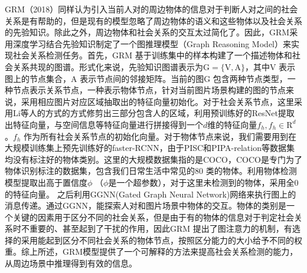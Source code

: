 GRM（2018）\cite{wang2018deep}同样认为引入当前人对的周边物体的信息对于判断人对之间的社会关系是有帮助的，但是现有的模型忽略了周边物体的语义和这些物体以及社会关系的先验知识。除此之外，周边物体和社会关系的交互太过简化了。因此，GRM采用深度学习结合先验知识制定了一个图推理模型（Graph Reasoning Model）来实现社会关系检测任务。首先，GRM 基于训练集中的样本构建了一个描述物体和社会关系共现的图谱。形式化来说，先验知识图谱表示为$\mathrm{G} = \{\mathrm{V},\mathrm{A}\}$，其中$\mathrm{V}$ 表示图上的节点集合，$\mathrm{A}$ 表示节点间的邻接矩阵。当前的图$\mathrm{G}$ 包含两种节点类型，一种节点表示关系节点，一种表示物体节点，针对当前图片场景构建的图的节点来说，采用相应图片对应区域抽取出的特征向量初始化。对于社会关系节点，这里采用Li等人的方式\cite{li2017dual-glance}的方式修剪出三部分包含人的区域，利用预训练好的ResNet提取出特征向量，与空间信息等特征向量进行拼接得到一个$d$维的特征向量$f_{h},f_{h} \in \mathrm{R}^d$。$f_h$ 作为所有社会关系节点的初始化向量。对于物体节点来说，我们需要用到在大规模训练集上预先训练好的faster-RCNN\cite{ren2015faster}，由于PISC和PIPA-relation等数据集均没有标注好的物体类别。这里的大规模数据集指的是COCO\cite{lin2014microsoft}，COCO是专门为了物体识别标注的数据集，包含我们日常生活中常见的80 类的物体。利用物体检测模型提取出高于置信度$\phi$ （$\phi$是一个超参数），对于这里未检测到的物体，采用全$0$ 的特征向量。
之后利用GGNN(Gated Graph Neural Network)网络\cite{li2016gated}来执行图上的消息传递。通过GGNN，能探索人对和图片场景中物体的交互。物体的类别是一个关键的因素用于区分不同的社会关系，但是由于有的物体的信息对于判定社会关系时不重要的、甚至起到了干扰的作用，因此GRM 提出了图注意力的机制，有选择的采用能起到区分不同社会关系的物体节点，按照区分能力的大小给予不同的权重。综上所述，GRM模型提供了一个可解释的方法来提高社会关系检测的能力，从周边场景中推理得到有效的信息。

